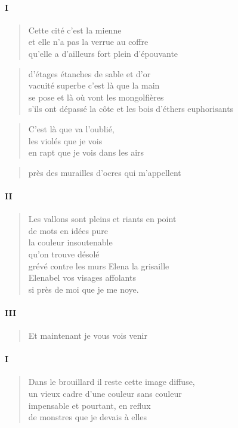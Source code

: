   \paragraph{I}
  \begin{verse}
    Cette cité c’est la mienne\\
    et elle n’a pas la verrue au coffre\\
    qu’elle a d’ailleurs fort plein d’épouvante
  \end{verse}
  \begin{verse}
    d’étages étanches de sable et d’or\\
    vacuité superbe c’est là que la main\\
    se pose et là où vont les mongolfières\\
    s’ils ont dépassé la côte et les bois d’éthers euphorisants
  \end{verse}
  \begin{verse}
    C’est là que va l’oublié,\\
    les violés que je vois\\
    en rapt que je vois dans les airs
  \end{verse}
  \begin{verse}
    près des murailles d’ocres qui m’appellent
  \end{verse}
  \paragraph{II}
  \begin{verse}
    Les vallons sont pleins et riants en point\\
    de mots en idées pure\\
    la couleur insoutenable\\
    qu’on trouve désolé\\
    grévé contre les murs Elena la grisaille\\
    Elenabel vos visages affolants\\
    si près de moi que je me noye.
  \end{verse}
  \paragraph{III}
  \begin{verse}
    Et maintenant je vous vois venir
  \end{verse}

  \paragraph{I}
  \begin{verse}
    Dans le brouillard il reste cette image diffuse,\\
    un vieux cadre d’une couleur sans couleur\\
    impensable et pourtant, en reflux\\
    de monstres que je devais à elles
  \end{verse}
